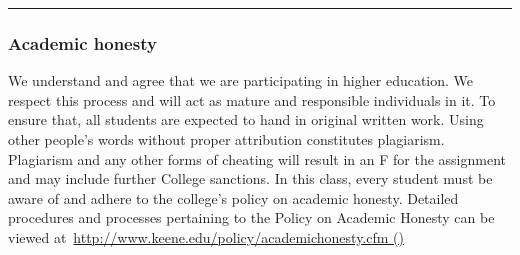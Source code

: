 \documentclass[
  letterpaper,
  DIV=11,
  numbers=noendperiod,
  oneside]{scrartcl}
\begin{document}
\begin{center}\rule{0.5\linewidth}{0.5pt}\end{center}

\subsubsection{Academic honesty}\label{academic-honesty}

We understand and agree that we are participating in higher education.
We respect this process and will act as mature and responsible
individuals in it. To ensure that, all students are expected to hand in
original written work. Using other people's words without proper
attribution constitutes plagiarism. Plagiarism and any other forms of
cheating will result in an F for the assignment and may include further
College sanctions. In this class, every student must be aware of and
adhere to the college's policy on academic honesty. Detailed procedures
and processes pertaining to the Policy on Academic Honesty can be viewed
at~\href{http://www.keene.edu/policy/academichonesty.cfm}{http://www.keene.edu/policy/academichonesty.cfm
()}
\end{document}
